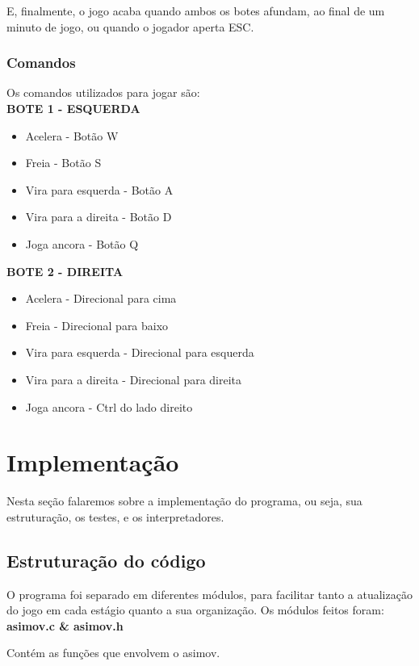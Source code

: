 \documentclass[12pt,a4paper]{article}
\begin{document}
E, finalmente, o jogo acaba quando ambos os botes afundam, ao final de um minuto de jogo, ou quando o jogador aperta ESC.

\subsubsection{Comandos}
Os comandos utilizados para jogar são:\\

\textbf{ BOTE 1 - ESQUERDA }
\begin{itemize}
\item Acelera             - Botão W
\item Freia               - Botão S
\item Vira para esquerda  - Botão A
\item Vira para a direita - Botão D
\item Joga ancora         - Botão Q
\end{itemize}


\textbf{BOTE 2 - DIREITA}
\begin{itemize}
\item Acelera             - Direcional para cima
\item Freia               - Direcional para baixo
\item Vira para esquerda  - Direcional para esquerda
\item Vira para a direita - Direcional para direita
\item Joga ancora         - Ctrl do lado direito
\end{itemize}

\section{Implementação}
Nesta seção falaremos sobre a implementação do programa, ou seja, sua estruturação, os testes, e os interpretadores.

\subsection{Estruturação do código}
O programa foi separado em diferentes módulos, para facilitar tanto a atualização do jogo em cada estágio quanto a sua organização.
Os módulos feitos foram:\\

\textbf{asimov.c \& asimov.h}

Contém as funções que envolvem o asimov.\\
\end{document}

